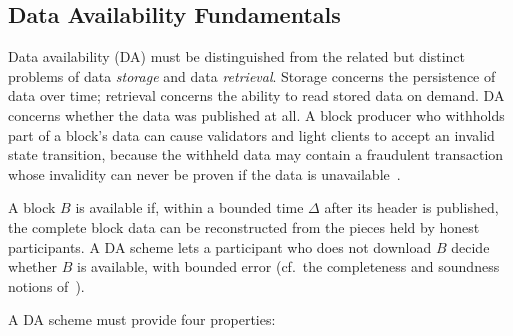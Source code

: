 
\subsection{Data Availability Fundamentals}
\label{subsec:da-fundamentals}

Data availability (DA) must be distinguished from the related but distinct problems of data \emph{storage} and data \emph{retrieval}.
Storage concerns the persistence of data over time; retrieval concerns the ability to read stored data on demand.
DA concerns whether the data was published at all.
A block producer who withholds part of a block's data can cause validators and light clients to accept an invalid state transition, because the withheld data may contain a fraudulent transaction whose invalidity can never be proven if the data is unavailable~\cite{AlBassam_FraudDA}.

\begin{definition}
A block $B$ is available if, within a bounded time $\Delta$ after its header is published, the complete block data can be reconstructed from the pieces held by honest participants. A DA scheme lets a participant who does not download $B$ decide whether $B$ is available, with bounded error (cf.\ the completeness and soundness notions of~\cite{HallAndersen2025FoundationsDAS}).
\end{definition}

A DA scheme must provide four properties:

